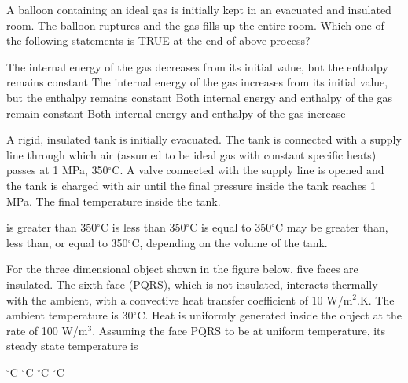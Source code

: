 \documentclass[addpoints,11pt]{exam}
\begin{document}
\begin{questions}
        \question A balloon containing an ideal gas is initially kept in an evacuated and insulated room. The balloon ruptures and the gas fills up the entire room. Which one of the following statements is TRUE at the end of above process?\\

        \begin{choices}
            \choice The internal energy of the gas decreases from its initial value, but the enthalpy remains constant
            \choice The internal energy of the gas increases from its initial value, but the enthalpy remains constant
            \choice Both internal energy and enthalpy of the gas remain constant
            \choice Both internal energy and enthalpy of the gas increase
        \end{choices}

        \question A rigid, insulated tank is initially evacuated. The tank is connected with a supply line through which air (assumed to be ideal gas with constant specific heats) passes at 1 MPa, 350$^\circ$C. A valve connected with the supply line is opened and the tank is charged with air until the final pressure inside the tank reaches 1 MPa. The final temperature inside the tank.%

        \begin{choices}
            \choice is greater than 350$^\circ$C
            \choice is less than 350$^\circ$C
            \choice is equal to 350$^\circ$C
            \choice may be greater than, less than, or equal to 350$^\circ$C, depending on the volume of the tank.
        \end{choices}

        \question For the three dimensional object shown in the figure below, five faces are insulated. The sixth face (PQRS), which is not insulated, interacts thermally with the ambient, with a convective heat transfer coefficient of 10 W/m$^2$.K. The ambient temperature is 30$^\circ$C. Heat is uniformly generated inside the object at the rate of 100 W/m$^3$. Assuming the face PQRS to be at uniform temperature, its steady state temperature is%

        \begin{oneparchoices}
            $^\circ$C
            $^\circ$C
            $^\circ$C
            $^\circ$C
        \end{oneparchoices}\\


\end{questions}
\end{document}
